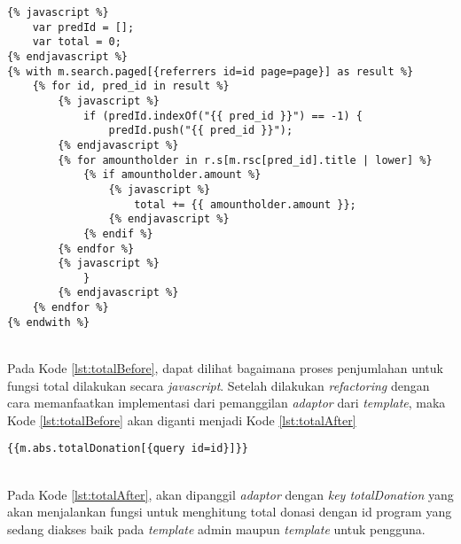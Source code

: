 \begin{minipage}{\linewidth}
\begin{lstlisting}[caption={Fungsi total sebelum \textit{refactoring}},label={lst:totalBefore}]
{% javascript %}
	var predId = [];
	var total = 0;
{% endjavascript %}
{% with m.search.paged[{referrers id=id page=page}] as result %}
	{% for id, pred_id in result %}
		{% javascript %}
			if (predId.indexOf("{{ pred_id }}") == -1) {
				predId.push("{{ pred_id }}");
		{% endjavascript %}
		{% for amountholder in r.s[m.rsc[pred_id].title | lower] %}
			{% if amountholder.amount %}
				{% javascript %}
					total += {{ amountholder.amount }};
				{% endjavascript %}
			{% endif %}
		{% endfor %}
		{% javascript %}
			}
		{% endjavascript %}
	{% endfor %}
{% endwith %}
\end{lstlisting}
\end{minipage} \\

Pada Kode \ref{lst:totalBefore}, dapat dilihat bagaimana proses penjumlahan untuk fungsi total dilakukan secara \textit{javascript}. Setelah dilakukan \textit{refactoring} dengan cara memanfaatkan implementasi dari pemanggilan \textit{adaptor} dari \textit{template}, maka Kode \ref{lst:totalBefore} akan diganti menjadi Kode \ref{lst:totalAfter}
\begin{minipage}{\linewidth}
\begin{lstlisting}[caption={Fungsi total setelah refactoring}, label={lst:totalAfter}]
{{m.abs.totalDonation[{query id=id}]}}
\end{lstlisting}
\end{minipage} \\

Pada Kode \ref{lst:totalAfter}, akan dipanggil \textit{adaptor} dengan \textit{key totalDonation} yang akan menjalankan fungsi untuk menghitung total donasi dengan id program yang sedang diakses baik pada \textit{template} admin maupun \textit{template} untuk pengguna.
